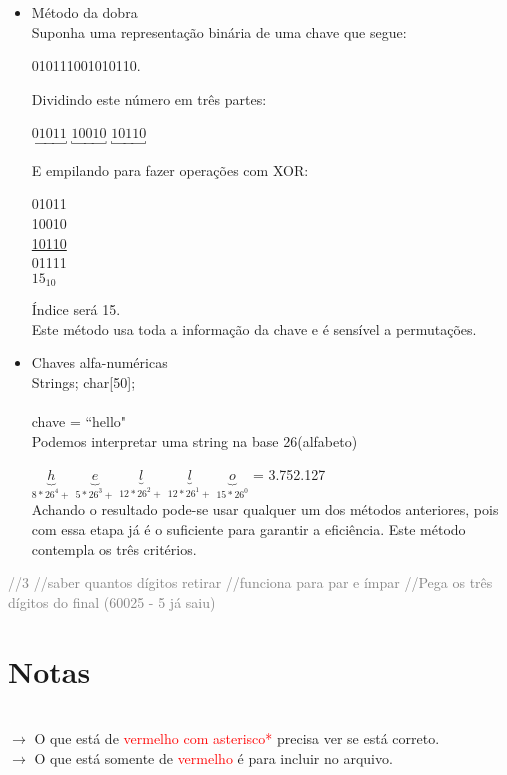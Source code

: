 \documentclass[a4paper, 12pt]{article}
\begin{document}
\begin{itemize}
\item {} Método da dobra\\
Suponha uma representação binária de uma chave que segue: 
\begin{center}
010111001010110.
\end{center}
Dividindo este número em três partes:
\begin{center}
$\underbracket{01011}_{}$ $\underbracket{10010}_{}$ $\underbracket{10110}_{}$
\end{center}
E empilando para fazer operações com XOR:
\begin{center}
01011\\
10010\\
\underline{10110}\\
01111\\
 $15_{10}$
\end{center}
Índice será 15.\\
Este método usa toda a informação da chave e é sensível a permutações.

\item {} Chaves alfa-numéricas\\
Strings; char[50];\\
\\
chave = ``hello"\\
Podemos interpretar uma string na base 26(alfabeto)

$\underbrace{h}_{8*26^4+}$ $\underbrace{e}_{5*26^3+}$ $\underbrace{l}_{12*26^2+}$ $\underbrace{l}_{12*26^1+}$ $\underbrace{o}_{15*26^0}$ = 3.752.127\\

Achando o resultado pode-se usar qualquer um dos métodos anteriores, pois com essa etapa já é o suficiente para garantir a eficiência.
Este método contempla os três critérios.
\end{itemize}

\begin{algorithmic}[1]
	\State {}
\EndIf
{}
\EndWhile
{} \textcolor{gray}{//3}
 \textcolor{gray}{//saber quantos dígitos retirar}
 \textcolor{gray}{//funciona para par e ímpar}
\EndFor
\State {} \textcolor{gray}{//Pega os três dígitos do final (60025 - 5 já saiu)}

\end{algorithmic}

\section{Notas}
\textcolor{white}{.}\\
$\rightarrow$ O que está de \textcolor{red}{vermelho com asterisco*} precisa ver se está correto.\\
$\rightarrow$ O que está somente de \textcolor{red}{vermelho} é para incluir no arquivo.
\end{document}
